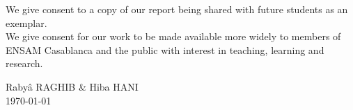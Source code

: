 \documentclass[a4paper,11pt,oneside]{book}
\begin{document}
    \noindent
    We give consent to a copy of our report being shared with future students as an exemplar. \\
    
    \noindent
    We give consent for our work to be made available more widely to members of ENSAM Casablanca and the public with interest in teaching, learning and research.
    ~\\[1cm]
    \begin{flushright}
    Rabyâ RAGHIB \& Hiba HANI\\
    \today
    \end{flushright}

     
    
    
   
       
    
    
    \tableofcontents
    \listoffigures
    \listoftables



    
    
    \mainmatter
    
    
    
    
    
    
    
    
    

   

    
    
    
    
    \begin{appendices}
        
    \end{appendices}
    
\end{document}

